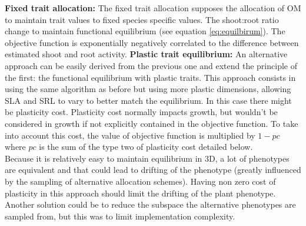 \documentclass[a4paper,twoside, justified,marginals=raggedright, nobib]{tufte-handout}
\begin{document}
\textbf{Fixed trait allocation:} The fixed trait allocation supposes the allocation of OM to maintain trait values to fixed species specific values. The shoot:root ratio change to maintain functional equilibrium (see equation \ref{eq:equilbirum}). The objective function is exponentially negatively correlated to the difference between estimated shoot and root activity.
\textbf{Plastic trait equilibrium:} An alternative approach can be easily derived from the previous one and extend the principle of the first: the functional equilibrium with plastic traits. This approach consists in using the same algorithm as before but using more plastic dimensions, allowing SLA and SRL to vary to better match the equilibrium. In this case there might be plasticity cost. Plasticity cost normally impacts growth, but wouldn't be considered in growth if not explicitly contained in the objective function. To take into account this cost, the value of objective function is multiplied by $1 - pc$ where $pc$ is the sum of the type two of plasticity cost detailed below.\\
\indent Because it is relatively easy to maintain equilibrium in 3D, a lot of phenotypes are equivalent and that could lead to drifting of the phenotype (greatly influenced by the sampling of alternative allocation schemes). Having non zero cost of plasticity in this approach should limit the drifting of the plant phenotype. Another solution could be to reduce the subspace the alternative phenotypes are sampled from, but this was to limit implementation complexity.\\
\end{document}
